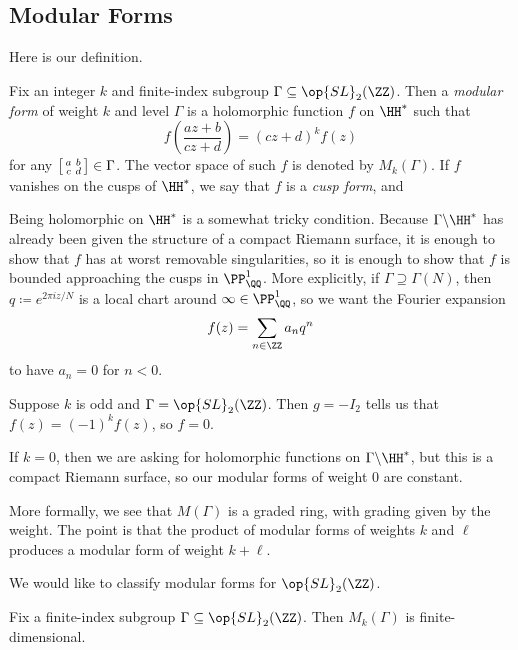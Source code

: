 \documentclass{article}
\begin{document}
\subsection{Modular Forms}
Here is our definition.
\begin{definition}
	Fix an integer $k$ and finite-index subgroup $\Gamma\subseteq\op{SL}_2(\ZZ)$. Then a \textit{modular form} of weight $k$ and level $\Gamma$ is a holomorphic function $f$ on $\HH^*$ such that
	\[f\left(\frac{az+b}{cz+d}\right)=(cz+d)^kf(z)\]
	for any $\begin{bsmallmatrix}
		a & b \\ c & d
	\end{bsmallmatrix}\in\Gamma$. The vector space of such $f$ is denoted by $M_k(\Gamma)$. If $f$ vanishes on the cusps of $\HH^*$, we say that $f$ is a \textit{cusp form}, and 
\end{definition}
\begin{remark}
	Being holomorphic on $\HH^*$ is a somewhat tricky condition. Because $\Gamma\backslash\HH^*$ has already been given the structure of a compact Riemann surface, it is enough to show that $f$ has at worst removable singularities, so it is enough to show that $f$ is bounded approaching the cusps in $\PP^1_\QQ$. More explicitly, if $\Gamma\supseteq\Gamma(N)$, then $q\coloneqq e^{2\pi iz/N}$ is a local chart around $\infty\in\PP^1_\QQ$, so we want the Fourier expansion
	\[f(z)=\sum_{n\in\ZZ}a_nq^n\]
	to have $a_n=0$ for $n<0$.
\end{remark}
\begin{remark} \label{rem:odd-weight}
	Suppose $k$ is odd and $\Gamma=\op{SL}_2(\ZZ)$. Then $g=-I_2$ tells us that $f(z)=(-1)^kf(z)$, so $f=0$.
\end{remark}
\begin{remark}
	If $k=0$, then we are asking for holomorphic functions on $\Gamma\backslash\HH^*$, but this is a compact Riemann surface, so our modular forms of weight $0$ are constant.
\end{remark}
\begin{remark}
	More formally, we see that $M(\Gamma)$ is a graded ring, with grading given by the weight. The point is that the product of modular forms of weights $k$ and $\ell$ produces a modular form of weight $k+\ell$.
\end{remark}
We would like to classify modular forms for $\op{SL}_2(\ZZ)$.
\begin{proposition} \label{prop:mk-fin-dim}
	Fix a finite-index subgroup $\Gamma\subseteq\op{SL}_2(\ZZ)$. Then $M_k(\Gamma)$ is finite-dimensional.
\end{proposition}
\end{document}
